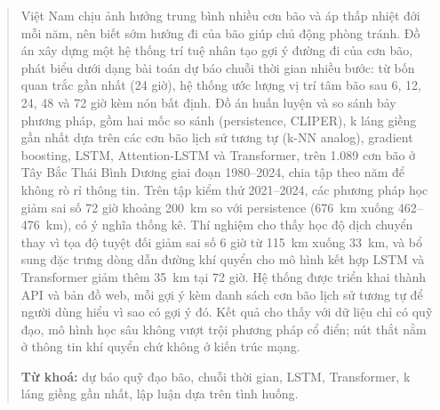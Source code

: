 \begin{abstract}

Việt Nam chịu ảnh hưởng trung bình nhiều cơn bão và áp thấp nhiệt đới mỗi
năm, nên biết sớm hướng đi của bão giúp chủ động phòng tránh. Đồ án xây dựng
một hệ thống trí tuệ nhân tạo gợi ý đường đi của cơn bão, phát biểu dưới dạng
bài toán dự báo chuỗi thời gian nhiều bước: từ bốn quan trắc gần nhất (24
giờ), hệ thống ước lượng vị trí tâm bão sau 6, 12, 24, 48 và 72 giờ kèm nón
bất định. Đồ án huấn luyện và so sánh bảy phương pháp, gồm hai mốc so sánh
(persistence, CLIPER), k láng giềng gần nhất dựa trên các cơn bão lịch sử
tương tự (k-NN analog), gradient boosting, LSTM, Attention-LSTM và
Transformer, trên 1.089 cơn bão ở Tây Bắc Thái Bình Dương giai đoạn
1980--2024, chia tập theo năm để không rò rỉ thông tin. Trên tập kiểm thử
2021--2024, các phương pháp học giảm sai số 72 giờ khoảng 200~km so với
persistence (676~km xuống 462--476~km), có ý nghĩa thống kê. Thí nghiệm cho
thấy học độ dịch chuyển thay vì tọa độ tuyệt đối giảm sai số 6 giờ từ 115~km
xuống 33~km, và bổ sung đặc trưng dòng dẫn đường khí quyển cho mô hình kết hợp
LSTM và Transformer giảm thêm 35~km tại 72 giờ. Hệ thống được triển khai thành
API và bản đồ web, mỗi gợi ý kèm danh sách cơn bão lịch sử tương tự để người
dùng hiểu vì sao có gợi ý đó. Kết quả cho thấy với dữ liệu chỉ có quỹ đạo, mô
hình học sâu không vượt trội phương pháp cổ điển; nút thắt nằm ở thông tin khí
quyển chứ không ở kiến trúc mạng.

\vspace{0.8em}
\noindent\textbf{Từ khoá:} dự báo quỹ đạo bão, chuỗi thời gian, LSTM,
Transformer, k láng giềng gần nhất, lập luận dựa trên tình huống.

\end{abstract}
